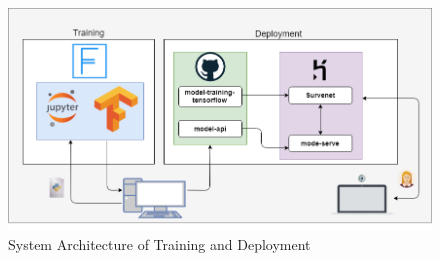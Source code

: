 \begin{figure}[ht]
	\begin{center}
		\advance\leftskip-3cm
		\advance\rightskip-3cm
		\includegraphics[keepaspectratio=true,scale=0.55]{__resources/Design/arch.png}
		\caption{System Architecture of Training and Deployment}
		\label{arch}
	\end{center}
\end{figure}

